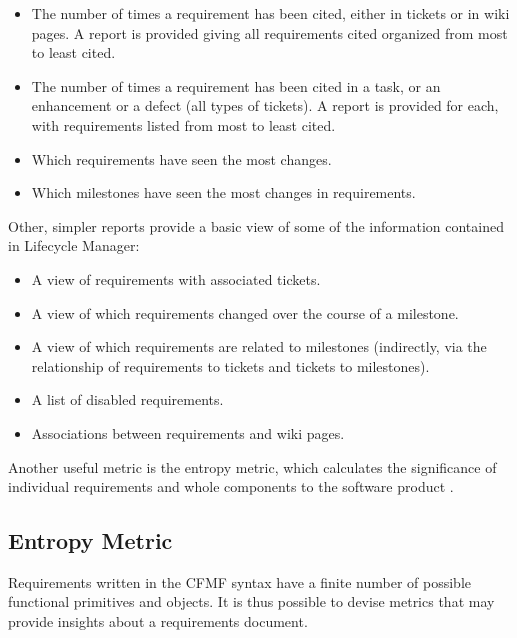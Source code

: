 \documentclass[letterpaper,10pt]{article}
\begin{document}
            \begin{itemize}
                \item The number of times a requirement has been cited, 
                    either in tickets or in wiki pages.  A report is 
                    provided giving all requirements cited organized from 
                    most to least cited.
                \item The number of times a requirement has been cited in a 
                    task, or an enhancement or a defect (all types of 
                    tickets).  A report is provided for each, with 
                    requirements listed from most to least cited.
                \item Which requirements have seen the most changes.
                \item Which milestones have seen the most changes in 
                    requirements.
            \end{itemize}

    Other, simpler reports provide a basic view of some of the information 
    contained in Lifecycle Manager:

            \begin{itemize}
                \item A view of requirements with associated tickets.
                \item A view of which requirements changed over the course 
                    of a milestone.
                \item A view of which requirements are related to milestones 
                    (indirectly, via the relationship of requirements to 
                    tickets and tickets to milestones).
                \item A list of disabled requirements.
                \item Associations between requirements and wiki pages.
            \end{itemize}

            Another useful metric is the entropy metric, which
            calculates the significance of individual requirements and
            whole components to the software product \cite{eckroth}.

		\subsection{Entropy Metric}

                Requirements written in the CFMF syntax have a finite
                number of possible functional primitives and
                objects. It is thus possible to devise metrics that
                may provide insights about a requirements document.
\end{document}
